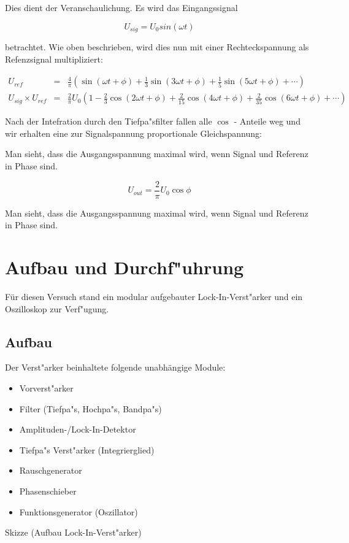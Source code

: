 \documentclass{scrartcl}
\begin{document}
			Dies dient der Veranschaulichung. Es wird das Eingangssignal

			\begin{displaymath}
				U_{sig} = U_0 sin(\omega t)
			\end{displaymath}

			betrachtet. Wie oben beschrieben,
			wird dies nun mit einer Rechteckspannung als Refenzsignal multipliziert:

			\begin{eqnarray*}
				U_{ref} &=& \frac{4}{\pi}
					\left( \sin(\omega t + \phi) + 
						\frac{1}{3} \sin(3 \omega t + \phi) + 
						\frac{1}{5} \sin(5 \omega t + \phi) + 
						\cdots 
					\right)	\\
				U_{sig} \times U_{ref} &=& \frac{2}{\pi} U_0 
				\left(
					1 - 
					\frac{2}{3}\cos(2 \omega t + \phi) + 
					\frac{2}{15} \cos(4 \omega t + \phi) + 
					\frac{2}{35} \cos(6 \omega t + \phi) + 
					\cdots 
				\right)
			\end{eqnarray*}

			Nach der Intefration durch den Tiefpa"sfilter fallen alle $\cos$ - Anteile weg und wir erhalten eine zur Signalspannung proportionale Gleichspannung:


			Man sieht, dass die Ausgangsspannung maximal wird, wenn Signal und Referenz in Phase sind.
		 

			\begin{equation}
				U_{out} = \frac{2}{\pi} U_0 \cos{\phi}
			\end{equation}


			Man sieht, dass die Ausgangsspannung maximal wird, wenn Signal und Referenz in Phase sind.

	\section{Aufbau und Durchf"uhrung}


		Für diesen Versuch stand ein modular aufgebauter Lock-In-Verst"arker und ein Oszilloskop zur Verf"ugung.
		
		\subsection{Aufbau}
	
			Der Verst"arker beinhaltete folgende unabhängige Module:\label{module}
	
			\begin{itemize}
				\item Vorverst"arker
				\item Filter (Tiefpa"s, Hochpa"s, Bandpa"s)
				\item Amplituden-/Lock-In-Detektor
				\item Tiefpa"s Verst"arker (Integrierglied)
				\item Rauschgenerator
				\item Phasenschieber
				\item Funktionsgenerator (Oszillator)
			\end{itemize}
			Skizze (Aufbau Lock-In-Verst"arker)
\end{document}
